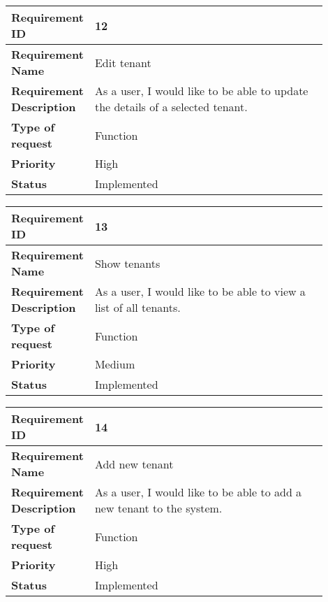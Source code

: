 \begin{table}[htbp]
\centering
\begin{tabular}{|m{0.15\linewidth}|m{0.75\linewidth}|}
\hline
\textbf{Requirement ID} & 12 \\
\hline
\textbf{Requirement Name} & Edit tenant \\
\hline
\textbf{Requirement Description} & As a user, I would like to be able to update the details of a selected tenant. \\
\hline
\textbf{Type of request} & Function \\
\hline
\textbf{Priority} & High \\
\hline
\textbf{Status} & Implemented \\
\hline
\end{tabular}
\end{table}

\begin{table}[htbp]
\centering
\begin{tabular}{|m{0.15\linewidth}|m{0.75\linewidth}|}
\hline
\textbf{Requirement ID} & 13 \\
\hline
\textbf{Requirement Name} & Show tenants \\
\hline
\textbf{Requirement Description} & As a user, I would like to be able to view a list of all tenants. \\
\hline
\textbf{Type of request} & Function \\
\hline
\textbf{Priority} & Medium \\
\hline
\textbf{Status} & Implemented \\
\hline
\end{tabular}
\end{table}

\begin{table}[htbp]
\centering
\begin{tabular}{|m{0.15\linewidth}|m{0.75\linewidth}|}
\hline
\textbf{Requirement ID} & 14 \\
\hline
\textbf{Requirement Name} & Add new tenant \\
\hline
\textbf{Requirement Description} & As a user, I would like to be able to add a new tenant to the system. \\
\hline
\textbf{Type of request} & Function \\
\hline
\textbf{Priority} & High \\
\hline
\textbf{Status} & Implemented \\
\hline
\end{tabular}
\end{table}

